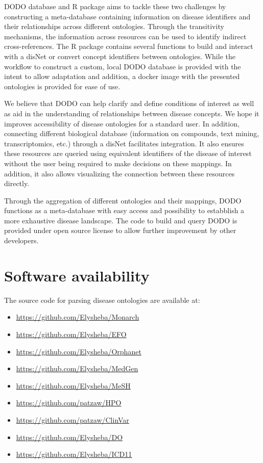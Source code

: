 \documentclass[9pt,a4paper,]{extarticle}
\begin{document}
DODO database and R package aims to tackle these two challenges by constructing a meta-database containing information on disease identifiers and their relationships across different ontologies. Through the transitivity mechanisms, the information across resources can be used to identify indirect cross-references. The R package contains several functions to build and interact with a disNet or convert concept identifiers between ontologies. While the workflow to construct a custom, local DODO database is provided with the intent to allow adaptation and addition, a docker image with the presented ontologies is provided for ease of use.

We believe that DODO can help clarify and define conditions of interest as well as aid in the understanding of relationships between disease concepts. We hope it improves accessibility of disease ontologies for a standard user. In addition, connecting different biological database (information on compounds, text mining, transcriptomics, etc.) through a disNet facilitates integration. It also ensures these resources are queried using equivalent identifiers of the disease of interest without the user being required to make decisions on these mappings. In addition, it also allows visualizing the connection between these resources directly.

Through the aggregation of different ontologies and their mappings, DODO functions as a meta-database with easy access and possibility to estabblish a more exhaustive disease landscape. The code to build and query DODO is provided under open source license to allow further improvement by other developers.

\hypertarget{software-availability}{%
\section{Software availability}\label{software-availability}}

The source code for parsing disease ontologies are available at:

\begin{itemize}
\item
  \url{https://github.com/Elysheba/Monarch}
\item
  \url{https://github.com/Elysheba/EFO}
\item
  \url{https://github.com/Elysheba/Orphanet}
\item
  \url{https://github.com/Elysheba/MedGen}
\item
  \url{https://github.com/Elysheba/MeSH}
\item
  \url{https://github.com/patzaw/HPO}
\item
  \url{https://github.com/patzaw/ClinVar}
\item
  \url{https://github.com/Elysheba/DO}
\item
  \url{https://github.com/Elysheba/ICD11}
\end{itemize}
\end{document}
